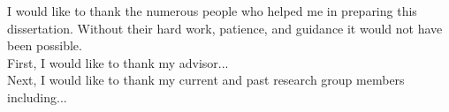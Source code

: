 \large
{\parindent0pt 
I would like to thank the numerous people who helped me in preparing this dissertation.  Without their hard work, patience, and guidance it would not have been possible. \\

First, I would like to thank my advisor...\\ 

Next, I would like to thank my current and past research group members including... \\

}

